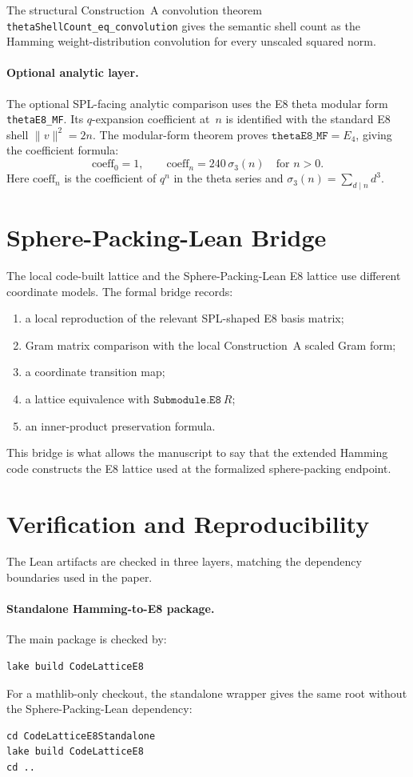 \documentclass[12pt]{article}
\theoremstyle{definition}
\newcommand{\code}[1]{\texttt{#1}}
\newcommand{\lean}[1]{\texttt{#1}}
\begin{document}
The structural Construction~A convolution theorem
\lean{thetaShellCount\_eq\_convolution} gives the semantic shell count as the
Hamming weight-distribution convolution for every unscaled squared norm.

\paragraph{Optional analytic layer.}
The optional SPL-facing analytic comparison uses the E8 theta modular form
\lean{thetaE8\_MF}.  Its $q$-expansion coefficient at~$n$ is identified with
the standard E8 shell $\|v\|^2 = 2n$.  The modular-form theorem proves
$\lean{thetaE8\_MF} = E_4$, giving the coefficient formula:
\[
  \text{coeff}_0 = 1, \qquad
  \text{coeff}_n = 240\,\sigma_3(n) \quad \text{for } n > 0.
\]
Here \(\text{coeff}_n\) is the coefficient of \(q^n\) in the theta series and
\(\sigma_3(n)=\sum_{d\mid n}d^3\).

\section{Sphere-Packing-Lean Bridge}
\label{app:spl}

The local code-built lattice and the Sphere-Packing-Lean E8 lattice use
different coordinate models.  The formal bridge records:
\begin{enumerate}
\item a local reproduction of the relevant SPL-shaped E8 basis matrix;
\item Gram matrix comparison with the local Construction~A scaled Gram form;
\item a coordinate transition map;
\item a lattice equivalence with $\code{Submodule.E8}\ R$;
\item an inner-product preservation formula.
\end{enumerate}
This bridge is what allows the manuscript to say that the extended Hamming code
constructs the E8 lattice used at the formalized sphere-packing endpoint.

\section{Verification and Reproducibility}
\label{app:verification}

The Lean artifacts are checked in three layers, matching the dependency
boundaries used in the paper.

\paragraph{Standalone Hamming-to-E8 package.}
The main package is checked by:
\begin{lstlisting}[style=shell]
lake build CodeLatticeE8
\end{lstlisting}
For a mathlib-only checkout, the standalone wrapper gives the same root without
the Sphere-Packing-Lean dependency:
\begin{lstlisting}[style=shell]
cd CodeLatticeE8Standalone
lake build CodeLatticeE8
cd ..
\end{lstlisting}
\end{document}

